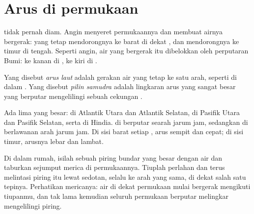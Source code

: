 \section{Arus di permukaan}

 tidak pernah diam. Angin menyeret permukaannya dan membuat airnya
bergerak:  yang tetap mendorongnya ke barat di dekat
, dan  mendorongnya ke timur di  tengah.
Seperti angin, air yang bergerak itu dibelokkan oleh perputaran Bumi: ke
kanan di , ke kiri di .

\begin{definition}\label{def:g8:the-oceans:current}
Yang disebut \emph{arus laut} adalah gerakan air 
yang tetap ke satu arah, seperti  di dalam . Yang disebut
\emph{pilin samudra} adalah lingkaran arus  yang
sangat besar yang berputar mengelilingi sebuah cekungan .
\end{definition}
\label{def:g8:the-oceans:gyre}

Ada lima  yang besar: di Atlantik Utara dan Atlantik Selatan,
di Pasifik Utara dan Pasifik Selatan, serta di  Hindia.  di
 berputar searah jarum jam, sedangkan  di  berlawanan arah jarum jam. Di sisi barat setiap , arus
 sempit dan cepat; di sisi timur, arusnya lebar dan lambat.

\begin{inthelab}
Di dalam rumah, isilah sebuah piring bundar yang besar dengan air dan
taburkan sejumput merica di permukaannya. Tiuplah perlahan dan terus
melintasi piring itu lewat sedotan, selalu ke arah yang sama, di dekat
salah satu tepinya. Perhatikan mericanya: air di dekat permukaan mulai
bergerak mengikuti tiupanmu, dan tak lama kemudian seluruh permukaan
berputar melingkar mengelilingi piring.
\end{inthelab}

